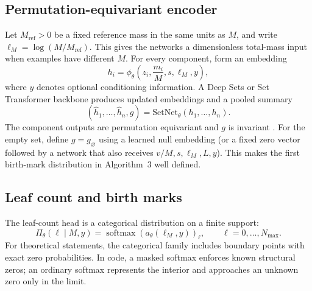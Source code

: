 \documentclass[10pt]{article}
\theoremstyle{definition}
\theoremstyle{remark}
\begin{document}
\subsection{Permutation-equivariant encoder}

Let $M_{\mathrm{ref}}>0$ be a fixed reference mass in the same units as
$M$, and write $\ell_M=\log(M/M_{\mathrm{ref}})$.  This gives the networks a
dimensionless total-mass input when examples have different $M$.
For every component, form an embedding
\begin{equation}
  h_i=\phi_\theta\!\left(z_i,\frac{m_i}{M},s,\ell_M,y\right),
  \label{eq:element-embedding}
\end{equation}
where $y$ denotes optional conditioning information.  A Deep Sets or Set Transformer backbone produces updated embeddings and a pooled summary
\begin{equation}
  (\widehat h_1,\ldots,\widehat h_n,g)
  =\mathrm{SetNet}_\theta(h_1,\ldots,h_n).
  \label{eq:set-backbone}
\end{equation}
The component outputs are permutation equivariant and $g$ is invariant
\cite{zaheer2017deepsets,lee2019settransformer}.
For the empty set, define $g=g_\varnothing$ using a learned null embedding
(or a fixed zero vector followed by a network that also receives
$v/M,s,\ell_M,L,y$).  This makes the first birth-mark distribution in
Algorithm~3 well defined.

\subsection{Leaf count and birth marks}

The leaf-count head is a categorical distribution on a finite support:
\begin{equation}
  \Pi_\theta(\ell\mid M,y)
  =\operatorname{softmax}\!\left(a_\theta(\ell_M,y)\right)_\ell,
  \qquad \ell=0,\ldots,N_{\max}.
  \label{eq:leaf-count-head}
\end{equation}
For theoretical statements, the categorical family includes boundary points
with exact zero probabilities.  In code, a masked softmax enforces known
structural zeros; an ordinary softmax represents the interior and approaches
an unknown zero only in the limit.
\end{document}
